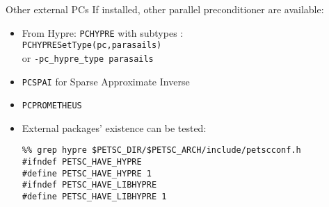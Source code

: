 \begin{higher}
\begin{numberedframe}{Other external PCs}
If installed, other parallel preconditioner are available:

\begin{itemize}
\item
  From Hypre: \lstinline{PCHYPRE} with subtypes :\\
  \lstinline{PCHYPRESetType(pc,parasails)}\\ or \lstinline{-pc_hypre_type parasails}
\item \lstinline{PCSPAI} for Sparse Approximate Inverse
\item \lstinline{PCPROMETHEUS}
\item External packages' existence can be tested:
\begin{verbatim}
%% grep hypre $PETSC_DIR/$PETSC_ARCH/include/petscconf.h
#ifndef PETSC_HAVE_HYPRE
#define PETSC_HAVE_HYPRE 1
#ifndef PETSC_HAVE_LIBHYPRE
#define PETSC_HAVE_LIBHYPRE 1
\end{verbatim}
\end{itemize}
\end{numberedframe}

\end{higher}

\endinput

